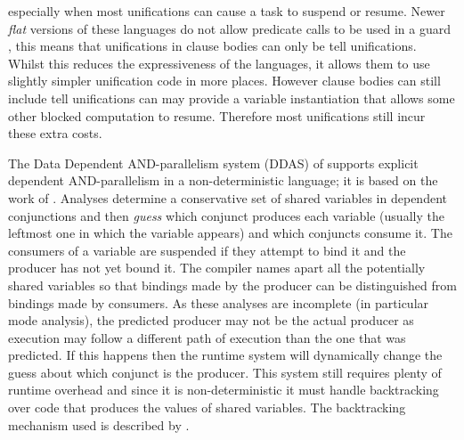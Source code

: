 especially when most unifications can cause a task to suspend or resume.
Newer \emph{flat} versions of these languages
do not allow predicate calls to be used in a guard
\citep*{taylor:flat_concur_prolog,foster:1987:flat_parlog,modedghc},
this means that unifications in clause bodies can only be tell unifications.
Whilst this reduces the expressiveness of the languages,
it allows them to use
slightly simpler unification code in more places.
However clause bodies can still include tell unifications can may provide a
variable instantiation that allows some other blocked computation to resume.
Therefore most unifications still incur these extra costs.

The Data Dependent AND-parallelism system (DDAS)
of \citet{pontelli:1996:ddas} supports explicit
dependent AND-parallelism in a non-deterministic language;
it is based on the work of \citet{gupta:1991:ace}.
Analyses determine a conservative set of shared variables in dependent
conjunctions and then \emph{guess} which conjunct produces each variable
(usually the leftmost one in which the variable appears)
and which conjuncts consume it.
The consumers of a variable are suspended if they attempt to bind it and the
producer has not yet bound it.
The compiler names apart all the potentially shared variables so
that bindings made by the producer can be distinguished
from bindings made by consumers.
As these analyses are incomplete (in particular mode analysis),
the predicted producer may not be the actual producer as execution may
follow a different path of execution than the one that was predicted.
If this happens then the runtime system will dynamically change the guess
about which conjunct is the producer.
This system still requires plenty of runtime overhead and since it is
non-deterministic it must handle backtracking over code that produces the
values of shared variables.
The backtracking mechanism used is described by \citet{shen:1996:daswam}.

